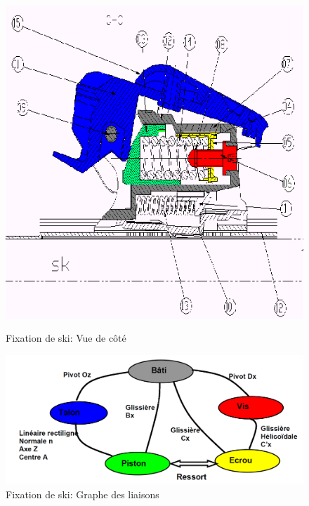 \begin{figure}[htbp]
\begin{minipage}[c]{.40\linewidth}
\begin{center}
\includegraphics[width=\linewidth]{img/ski2.png}
\caption{Fixation de ski: Vue de côté}
\label{fig:image3}
\end{center}
\end{minipage}
\hfill
\begin{minipage}[c]{.55\linewidth}
\begin{center}
\includegraphics[width=\linewidth]{img/ski3.png}
\caption{Fixation de ski: Graphe des liaisons}
\label{fig:image4}
\end{center}
\end{minipage}
\end{figure}

